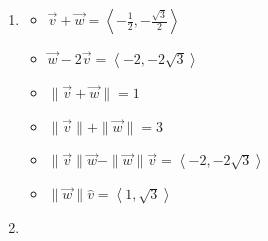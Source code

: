 \documentclass{ximera}
\begin{document}
\begin{enumerate}
\begin{itemize}

\item  $\overrightarrow{v} + \overrightarrow{w} = \left<0,0\right> $ 
\item  $\overrightarrow{w}  - 2\overrightarrow{v}  = \left<-\frac{3\sqrt{2}}{2}, \frac{3\sqrt{2}}{2} \right>$ 


\item $\| \overrightarrow{v} + \overrightarrow{w} \| = 0$ 
\item  $\| \overrightarrow{v} \| + \| \overrightarrow{w}\| = 2$ 


\item $\| \overrightarrow{v} \| \overrightarrow{w} - \| \overrightarrow{w} \| \overrightarrow{v}  = \left<-\sqrt{2},\sqrt{2}\right>$ 
\item $\|\overrightarrow{w}\| \hat{v}= \left<\frac{\sqrt{2}}{2}, -\frac{\sqrt{2}}{2} \right>$ 

\end{itemize}

 

\item  

 

\begin{itemize}

\item  $\overrightarrow{v} + \overrightarrow{w} = \left<-\frac{1}{2}, -\frac{\sqrt{3}}{2}\right> $ 
\item  $\overrightarrow{w}  - 2\overrightarrow{v}  = \left<-2, -2\sqrt{3} \right>$ 



\item $\| \overrightarrow{v} + \overrightarrow{w} \| = 1$ 
\item  $\| \overrightarrow{v} \| + \| \overrightarrow{w}\| = 3$ 



\item $\| \overrightarrow{v} \| \overrightarrow{w} - \| \overrightarrow{w} \| \overrightarrow{v}  = \left<-2,-2\sqrt{3}\right>$ 
\item $\|\overrightarrow{w}\| \hat{v}= \left<1, \sqrt{3} \right>$ 

\end{itemize}

 

\item  

 

\begin{itemize}


\end{itemize}
\end{enumerate}
\end{document}
